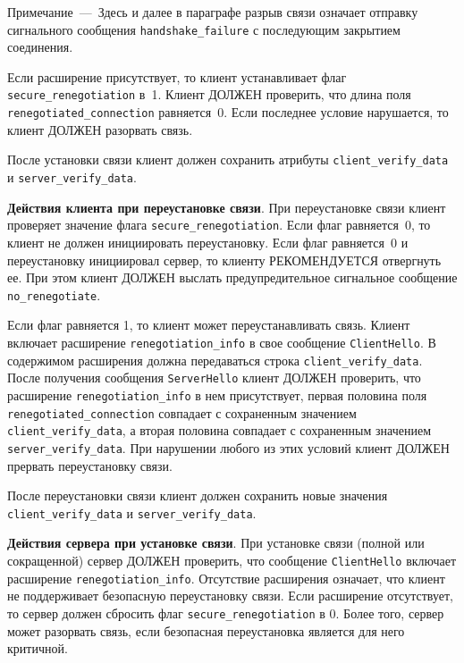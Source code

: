 \begin{note}
Примечание~---~Здесь и далее в параграфе разрыв связи означает отправку 
сигнального сообщения \lstinline{handshake_failure} с последующим закрытием 
соединения.
\end{note} 

Если расширение присутствует, то клиент устанавливает флаг 
\lstinline{secure_renegotiation} в~1. Клиент ДОЛЖЕН проверить, что длина поля 
\lstinline{renegotiated_connection} равняется~0. Если последнее условие 
нарушается, то клиент ДОЛЖЕН разорвать связь. 

После установки связи клиент должен сохранить атрибуты 
\lstinline{client_verify_data} и \lstinline{server_verify_data}. 

{\bf Действия клиента при переустановке связи}. 
При переустановке связи клиент проверяет значение флага 
\lstinline{secure_renegotiation}. Если флаг равняется~0, то клиент не должен 
инициировать переустановку. Если флаг
равняется~0 и переустановку инициировал сервер, то клиенту РЕКОМЕНДУЕТСЯ
отвергнуть ее. При этом клиент ДОЛЖЕН выслать предупредительное сигнальное
сообщение \lstinline{no_renegotiate}.

Если флаг равняется 1, то клиент может переустанавливать связь. Клиент
включает расширение \lstinline{renegotiation_info} в свое сообщение
\lstinline{ClientHello}. В содержимом расширения должна передаваться строка
\lstinline{client_verify_data}. После получения сообщения
\lstinline{ServerHello} клиент ДОЛЖЕН проверить, что расширение
\lstinline{renegotiation_info} в нем присутствует, первая половина поля
\lstinline{renegotiated_connection} совпадает с сохраненным значением
\lstinline{client_verify_data}, а вторая половина совпадает с сохраненным
значением \lstinline{server_verify_data}. При нарушении любого из этих
условий клиент ДОЛЖЕН прервать переустановку связи.

После переустановки связи клиент должен сохранить новые 
значения \lstinline{client_verify_data} и \lstinline{server_verify_data}. 

{\bf Действия сервера при установке связи}. 
При установке связи (полной или сокращенной) сервер ДОЛЖЕН проверить, что
сообщение \lstinline{ClientHello} включает расширение
\lstinline{renegotiation_info}. Отсутствие расширения означает, что клиент
не поддерживает безопасную переустановку связи. 
Если расширение отсутствует, то сервер должен сбросить флаг
\lstinline{secure_renegotiation} в 0. Более того, сервер может разорвать 
связь, если безопасная переустановка является для него критичной.

